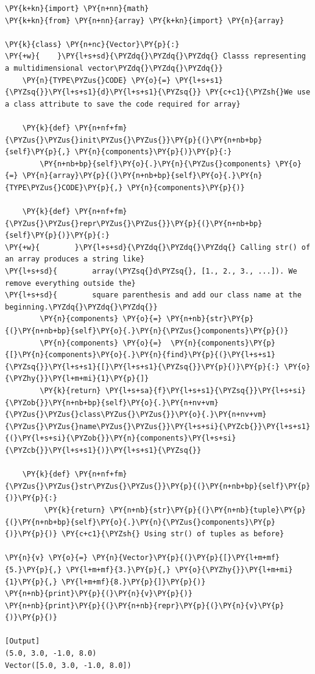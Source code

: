 \begin{Verbatim}[label=\makebox{\url{https://github.com/lucabaldini/cmepda/tree/master/slides/latex/snippets/vector.py}},commandchars=\\\{\}]
\PY{k+kn}{import} \PY{n+nn}{math}
\PY{k+kn}{from} \PY{n+nn}{array} \PY{k+kn}{import} \PY{n}{array}

\PY{k}{class} \PY{n+nc}{Vector}\PY{p}{:}
\PY{+w}{    }\PY{l+s+sd}{\PYZdq{}\PYZdq{}\PYZdq{} Classs representing a multidimensional vector\PYZdq{}\PYZdq{}\PYZdq{}}
    \PY{n}{TYPE\PYZus{}CODE} \PY{o}{=} \PY{l+s+s1}{\PYZsq{}}\PY{l+s+s1}{d}\PY{l+s+s1}{\PYZsq{}} \PY{c+c1}{\PYZsh{}We use a class attribute to save the code required for array}

    \PY{k}{def} \PY{n+nf+fm}{\PYZus{}\PYZus{}init\PYZus{}\PYZus{}}\PY{p}{(}\PY{n+nb+bp}{self}\PY{p}{,} \PY{n}{components}\PY{p}{)}\PY{p}{:}
        \PY{n+nb+bp}{self}\PY{o}{.}\PY{n}{\PYZus{}components} \PY{o}{=} \PY{n}{array}\PY{p}{(}\PY{n+nb+bp}{self}\PY{o}{.}\PY{n}{TYPE\PYZus{}CODE}\PY{p}{,} \PY{n}{components}\PY{p}{)}

    \PY{k}{def} \PY{n+nf+fm}{\PYZus{}\PYZus{}repr\PYZus{}\PYZus{}}\PY{p}{(}\PY{n+nb+bp}{self}\PY{p}{)}\PY{p}{:}
\PY{+w}{        }\PY{l+s+sd}{\PYZdq{}\PYZdq{}\PYZdq{} Calling str() of an array produces a string like}
\PY{l+s+sd}{        array(\PYZsq{}d\PYZsq{}, [1., 2., 3., ...]). We remove everything outside the}
\PY{l+s+sd}{        square parenthesis and add our class name at the beginning.\PYZdq{}\PYZdq{}\PYZdq{}}
        \PY{n}{components} \PY{o}{=} \PY{n+nb}{str}\PY{p}{(}\PY{n+nb+bp}{self}\PY{o}{.}\PY{n}{\PYZus{}components}\PY{p}{)}
        \PY{n}{components} \PY{o}{=}  \PY{n}{components}\PY{p}{[}\PY{n}{components}\PY{o}{.}\PY{n}{find}\PY{p}{(}\PY{l+s+s1}{\PYZsq{}}\PY{l+s+s1}{[}\PY{l+s+s1}{\PYZsq{}}\PY{p}{)}\PY{p}{:} \PY{o}{\PYZhy{}}\PY{l+m+mi}{1}\PY{p}{]}
        \PY{k}{return} \PY{l+s+sa}{f}\PY{l+s+s1}{\PYZsq{}}\PY{l+s+si}{\PYZob{}}\PY{n+nb+bp}{self}\PY{o}{.}\PY{n+nv+vm}{\PYZus{}\PYZus{}class\PYZus{}\PYZus{}}\PY{o}{.}\PY{n+nv+vm}{\PYZus{}\PYZus{}name\PYZus{}\PYZus{}}\PY{l+s+si}{\PYZcb{}}\PY{l+s+s1}{(}\PY{l+s+si}{\PYZob{}}\PY{n}{components}\PY{l+s+si}{\PYZcb{}}\PY{l+s+s1}{)}\PY{l+s+s1}{\PYZsq{}}

    \PY{k}{def} \PY{n+nf+fm}{\PYZus{}\PYZus{}str\PYZus{}\PYZus{}}\PY{p}{(}\PY{n+nb+bp}{self}\PY{p}{)}\PY{p}{:}
         \PY{k}{return} \PY{n+nb}{str}\PY{p}{(}\PY{n+nb}{tuple}\PY{p}{(}\PY{n+nb+bp}{self}\PY{o}{.}\PY{n}{\PYZus{}components}\PY{p}{)}\PY{p}{)} \PY{c+c1}{\PYZsh{} Using str() of tuples as before}

\PY{n}{v} \PY{o}{=} \PY{n}{Vector}\PY{p}{(}\PY{p}{[}\PY{l+m+mf}{5.}\PY{p}{,} \PY{l+m+mf}{3.}\PY{p}{,} \PY{o}{\PYZhy{}}\PY{l+m+mi}{1}\PY{p}{,} \PY{l+m+mf}{8.}\PY{p}{]}\PY{p}{)}
\PY{n+nb}{print}\PY{p}{(}\PY{n}{v}\PY{p}{)}
\PY{n+nb}{print}\PY{p}{(}\PY{n+nb}{repr}\PY{p}{(}\PY{n}{v}\PY{p}{)}\PY{p}{)}

[Output]
(5.0, 3.0, -1.0, 8.0)
Vector([5.0, 3.0, -1.0, 8.0])
\end{Verbatim}